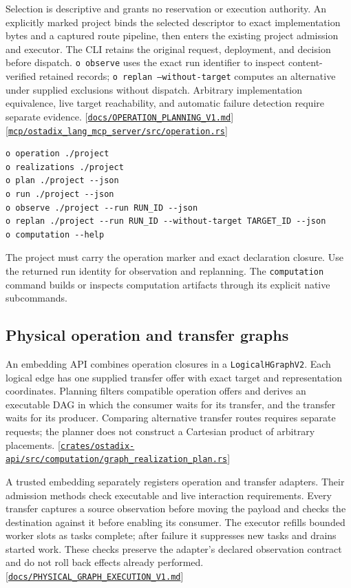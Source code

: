 \documentclass[11pt,oneside]{article}
\newcommand{\src}[1]{\textcolor{OSlate}{\scriptsize[\href{https://github.com/lostadi/OSTADIX/blob/c0b02c326b2329a95ba52447c7180bc93957cd57/#1}{\nolinkurl{#1}}]}\allowbreak}
\begin{document}
Selection is descriptive and grants no reservation or execution authority.
An explicitly marked project binds the selected descriptor to exact
implementation bytes and a captured route pipeline, then enters the existing
project admission and executor. The CLI retains the original request,
deployment, and decision before dispatch. \texttt{o observe} uses the exact
run identifier to inspect content-verified retained records;
\texttt{o replan --without-target} computes an alternative under supplied
exclusions without dispatch. Arbitrary implementation equivalence, live
target reachability, and automatic failure detection require separate evidence.
\src{docs/OPERATION_PLANNING_V1.md}
\src{mcp/ostadix_lang_mcp_server/src/operation.rs}

\begin{lstlisting}[style=plaincode]
o operation ./project
o realizations ./project
o plan ./project --json
o run ./project --json
o observe ./project --run RUN_ID --json
o replan ./project --run RUN_ID --without-target TARGET_ID --json
o computation --help
\end{lstlisting}

The project must carry the operation marker and exact declaration closure.
Use the returned run identity for observation and replanning. The
\texttt{computation} command builds or inspects computation artifacts through
its explicit native subcommands.


\subsection{Physical operation and transfer graphs}

An embedding API combines operation closures in a \texttt{LogicalHGraphV2}. Each logical edge has one supplied
transfer offer with exact target and representation coordinates. Planning
filters compatible operation offers and derives an executable DAG in which
the consumer waits for its transfer, and the transfer waits for its producer.
Comparing alternative transfer routes requires separate requests; the planner
does not construct a Cartesian product of arbitrary placements.
\src{crates/ostadix-api/src/computation/graph_realization_plan.rs}

A trusted embedding separately registers operation and transfer adapters.
Their admission methods check executable and live interaction requirements.
Every transfer captures a source observation before moving the payload and
checks the destination against it before enabling its consumer. The executor
refills bounded worker slots as tasks complete; after failure it suppresses
new tasks and drains started work. These checks preserve the adapter's declared
observation contract and do not roll back effects already performed.
\src{docs/PHYSICAL_GRAPH_EXECUTION_V1.md}
\end{document}
